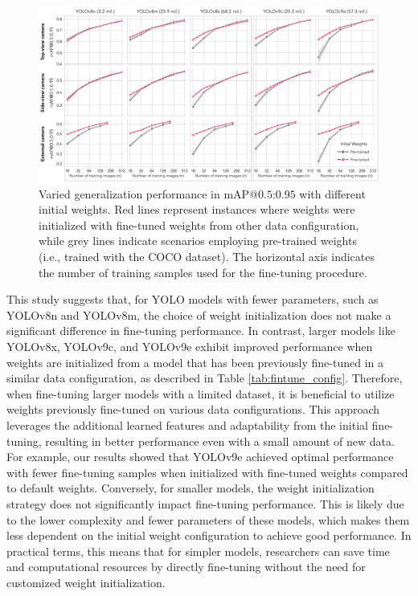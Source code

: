 \begin{figure}[H]
    \centerline{\includegraphics[width=\columnwidth]{figure_5.jpg}}
    \caption{Varied generalization performance in $\text{mAP@{0.5:0.95}}$ with different initial weights. Red lines represent instances where weights were initialized with fine-tuned weights from other data configuration, while grey lines indicate scenarios employing pre-trained weights (i.e., trained with the COCO dataset). The horizontal axis indicates the number of training samples used for the fine-tuning procedure.}
    \label{fig:finetune}
\end{figure}

This study suggests that, for YOLO models with fewer parameters, such as YOLOv8n and YOLOv8m, the choice of weight initialization does not make a significant difference in fine-tuning performance. In contrast, larger models like YOLOv8x, YOLOv9c, and YOLOv9e exhibit improved performance when weights are initialized from a model that has been previously fine-tuned in a similar data configuration, as described in Table \ref{tab:fintune_config}. Therefore, when fine-tuning larger models with a limited dataset, it is beneficial to utilize weights previously fine-tuned on various data configurations. This approach leverages the additional learned features and adaptability from the initial fine-tuning, resulting in better performance even with a small amount of new data. For example, our results showed that YOLOv9e achieved optimal performance with fewer fine-tuning samples when initialized with fine-tuned weights compared to default weights. Conversely, for smaller models, the weight initialization strategy does not significantly impact fine-tuning performance. This is likely due to the lower complexity and fewer parameters of these models, which makes them less dependent on the initial weight configuration to achieve good performance. In practical terms, this means that for simpler models, researchers can save time and computational resources by directly fine-tuning without the need for customized weight initialization.

